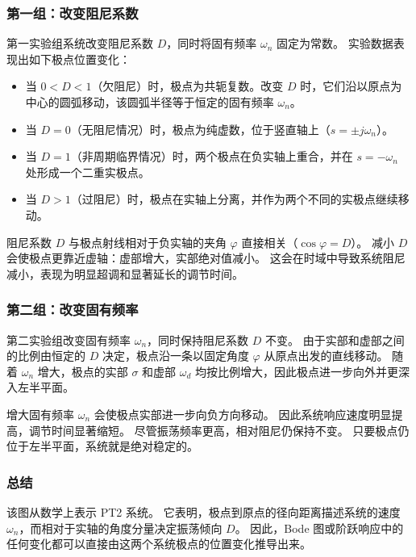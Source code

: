 \subsubsection{第一组：改变阻尼系数}

第一实验组系统改变阻尼系数 $D$，同时将固有频率 $\omega_n$ 固定为常数。
实验数据表现出如下极点位置变化：
\begin{itemize}
  \item 当 $0 < D < 1$（欠阻尼）时，极点为共轭复数。改变 $D$ 时，它们沿以原点为中心的圆弧移动，该圆弧半径等于恒定的固有频率 $\omega_n$。
  \item 当 $D = 0$（无阻尼情况）时，极点为纯虚数，位于竖直轴上（$s = \pm j\omega_n$）。
  \item 当 $D = 1$（非周期临界情况）时，两个极点在负实轴上重合，并在 $s = -\omega_n$ 处形成一个二重实极点。
  \item 当 $D > 1$（过阻尼）时，极点在实轴上分离，并作为两个不同的实极点继续移动。
\end{itemize}

阻尼系数 $D$ 与极点射线相对于负实轴的夹角 $\varphi$ 直接相关（$\cos\varphi = D$）。
减小 $D$ 会使极点更靠近虚轴：虚部增大，实部绝对值减小。
这会在时域中导致系统阻尼减小，表现为明显超调和显著延长的调节时间。

\subsubsection{第二组：改变固有频率}

第二实验组改变固有频率 $\omega_n$，同时保持阻尼系数 $D$ 不变。
由于实部和虚部之间的比例由恒定的 $D$ 决定，极点沿一条以固定角度 $\varphi$ 从原点出发的直线移动。
随着 $\omega_n$ 增大，极点的实部 $\sigma$ 和虚部 $\omega_d$ 均按比例增大，因此极点进一步向外并更深入左半平面。

增大固有频率 $\omega_n$ 会使极点实部进一步向负方向移动。
因此系统响应速度明显提高，调节时间显著缩短。
尽管振荡频率更高，相对阻尼仍保持不变。
只要极点仍位于左半平面，系统就是绝对稳定的。

\subsubsection{总结}

该图从数学上表示 PT2 系统。
它表明，极点到原点的径向距离描述系统的速度 $\omega_n$，而相对于实轴的角度分量决定振荡倾向 $D$。
因此，Bode 图或阶跃响应中的任何变化都可以直接由这两个系统极点的位置变化推导出来。
